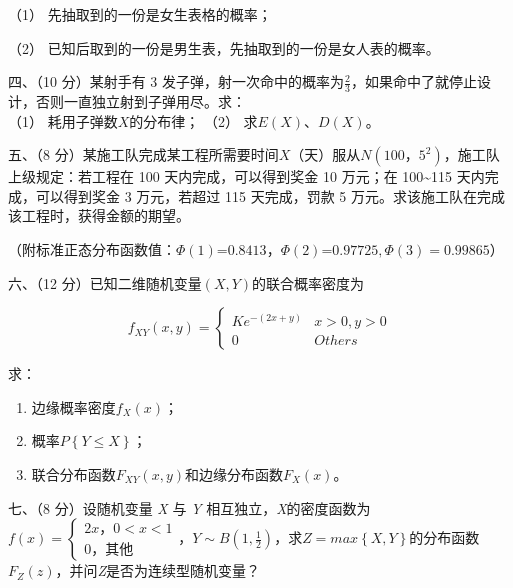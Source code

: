\documentclass[fontset=exam]{exam-zh}
\begin{document}
（1） 先抽取到的一份是女生表格的概率；

（2） 已知后取到的一份是男生表，先抽取到的一份是女人表的概率。


四、（10 分）某射手有 3 发子弹，射一次命中的概率为\(\frac{2}{3}\)，如果命中了就停止设计，否则一直独立射到子弹用尽。求：\\
（1） 耗用子弹数\(X\)的分布律； （2） 求\(E(X)\)、\(D(X)\)。


五、（8 分）某施工队完成某工程所需要时间\(X\)（天）服从\(N\left( {100\text{，}\allowbreak 5^{2}} \right)\)，施工队上级规定：若工程在 100 天内完成，可以得到奖金 10 万元；在 100\textasciitilde115 天内完成，可以得到奖金 3 万元，若超过 115 天完成，罚款 5 万元。求该施工队在完成该工程时，获得金额的期望。

（附标准正态分布函数值：\(\Phi(1)\text{=}0.8413\text{，}\allowbreak \Phi(2)\text{=}0.97725,\Phi(3) = 0.99865\)）


六、（12 分）已知二维随机变量\(\left( {X,Y} \right)\)的联合概率密度为

\[f_{XY}(x,y) = \left\{ \begin{matrix}
{Ke^{- (2x + y)}} & {x > 0,y > 0} \\
0 & {Others}
\end{matrix} \right.\]

求：

\begin{enumerate}
\def\labelenumi{\arabic{enumi}.}
\item
  边缘概率密度\(f_{X}(x)\)；
\item
  概率\(P\left\{ {Y \leq X} \right\}\)；
\item
  联合分布函数\(F_{XY}(x,y)\)和边缘分布函数\(F_{X}(x)\)。
\end{enumerate}


七、（8 分）设随机变量 \emph{X} 与 \emph{Y} 相互独立，\emph{X}的密度函数为\(f(x) = \left\{ \begin{matrix}
{2x\text{，}\allowbreak 0 < x < 1} \\
{0\text{，其他}}
\end{matrix} \right.\)，\(\left. Y \right.\sim B(1,\frac{1}{2})\)，求\(Z = max\left\{ X,Y \right\}\)的分布函数\(F_{Z}(z)\)，并问\emph{Z}是否为连续型随机变量？
\end{document}
